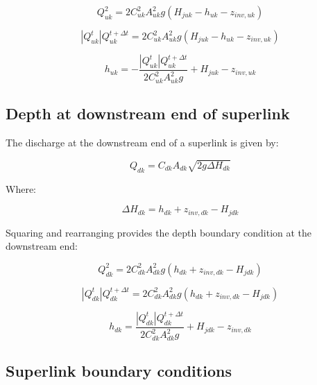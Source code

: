 \documentclass[11pt]{article}
\begin{document}
\begin{equation}
 Q_{uk}^2 = 2 C_{uk}^2 A_{uk}^2 g (H_{juk} - h_{uk} - z_{inv, uk})
\end{equation}

\begin{equation}
 |Q_{uk}^{t}| Q_{uk}^{t + \Delta t} = 2 C_{uk}^2 A_{uk}^2 g (H_{juk} - h_{uk} - z_{inv, uk})
\end{equation}

\begin{equation}
  h_{uk} = -\frac{|Q_{uk}^{t}| Q_{uk}^{t + \Delta t}}{ 2 C_{uk}^2 A_{uk}^2 g} + H_{juk} - z_{inv, uk}
\end{equation}

\subsection{Depth at downstream end of superlink}

The discharge at the downstream end of a superlink is given by:

\begin{equation}
 Q_{dk} = C_{dk} A_{dk} \sqrt{2 g \Delta H_{dk}} 
\end{equation}

Where:

\begin{equation}
 \Delta H_{dk} = h_{dk} + z_{inv, dk} - H_{jdk}
\end{equation}

Squaring and rearranging provides the depth boundary condition at the downstream
end:

\begin{equation}
 Q_{dk}^2 = 2 C_{dk}^2 A_{dk}^2 g (h_{dk} + z_{inv, dk} - H_{jdk})
\end{equation}

\begin{equation}
 |Q_{dk}^{t}| Q_{dk}^{t + \Delta t} = 2 C_{dk}^2 A_{dk}^2 g (h_{dk} + z_{inv, dk} - H_{jdk})
\end{equation}

\begin{equation}
  h_{dk} = \frac{|Q_{dk}^{t}| Q_{dk}^{t + \Delta t}}{2 C_{dk}^2 A_{dk}^2 g} + H_{jdk} - z_{inv, dk}
\end{equation}

\subsection{Superlink boundary conditions}
\end{document}
